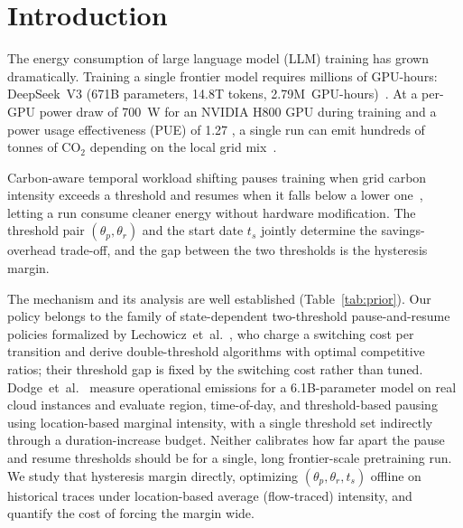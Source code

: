 \documentclass[runningheads]{llncs}
\begin{document}
\section{Introduction}

The energy consumption of large language model (LLM) training has
grown dramatically. Training a single frontier model requires
millions of GPU-hours: DeepSeek~V3 (671B parameters, 14.8T tokens,
2.79M~GPU-hours)~\cite{deepseek-ai_deepseek-v3_2024}. At a per-GPU
power draw of 700~W for an NVIDIA H800 GPU during training
\cite{h800_specs} and a power usage effectiveness (PUE) of 1.27
\cite{jegham_hungry_2025}, a single run can emit hundreds of tonnes
of CO$_2$ depending on the local grid mix~\cite{patterson_carbon_nodate}.

Carbon-aware temporal workload shifting pauses training when grid
carbon intensity exceeds a threshold and resumes when it falls below
a lower one~\cite{lechowicz_pause_2023}, letting a run consume
cleaner energy without hardware modification. The threshold pair
$(\theta_p, \theta_r)$ and the start date $t_s$ jointly determine the
savings-overhead trade-off, and the gap between the two thresholds is
the hysteresis margin.

The mechanism and its analysis are well established
(Table~\ref{tab:prior}). Our policy belongs to the family of
state-dependent two-threshold pause-and-resume policies formalized by
Lechowicz~et~al.~\cite{lechowicz_pause_2023}, who charge a switching
cost per transition and derive double-threshold algorithms with
optimal competitive ratios; their threshold gap is fixed by the
switching cost rather than tuned.
Dodge~et~al.~\cite{dodge_measuring_2022} measure operational
emissions for a 6.1B-parameter model on real cloud instances and
evaluate region, time-of-day, and threshold-based pausing using
location-based marginal intensity, with a single threshold set
indirectly through a duration-increase budget. Neither calibrates how
far apart the pause and resume thresholds should be for a single,
long frontier-scale pretraining run. We study that hysteresis margin
directly, optimizing $(\theta_p,\theta_r,t_s)$ offline on historical
traces under location-based average (flow-traced) intensity, and
quantify the cost of forcing the margin wide.
\end{document}
